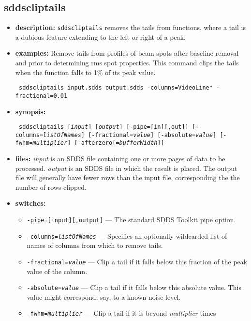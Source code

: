\newpage
\subsection{sddscliptails}
\label{sddscliptails}

\begin{itemize}
\item {\bf description:}
\verb|sddscliptails| removes the tails from functions, where a tail is a dubious feature
extending to the left or right of a peak.
\item {\bf examples:}
Remove tails from profiles of beam spots after baseline removal and prior to determining
rms spot properties.  This command clips the tails when the function falls to 1\% of
its peak value.
\begin{flushleft}{\tt
sddscliptails input.sdds output.sdds -columns=VideoLine* -fractional=0.01
}\end{flushleft}
\item {\bf synopsis:} 
\begin{flushleft}{\tt
sddscliptails [{\em input}] [{\em output}] [-pipe=[in][,out]]
[-columns={\em listOfNames}] [-fractional={\em value}] [-absolute={\em value}] [-fwhm={\em multiplier}]
[-afterzero[={\em bufferWidth}]]
}\end{flushleft}
\item {\bf files:}
{\em input} is an SDDS file containing one or more pages of data to be processed.
{\em output} is an SDDS file in which the result is placed.  The output file will
generally have fewer rows than the input file, corresponding the the number of
rows clipped.
\item {\bf switches:}
    \begin{itemize}
    \item {\tt -pipe=[input][,output]} --- The standard SDDS Toolkit pipe option.
    \item {\tt -columns={\em listOfNames}} --- Specifies an optionally-wildcarded list
        of names of columns from which to remove tails.
    \item {\tt -fractional={\em value}} --- Clip a tail if it falls below this fraction of the peak
        value of the column.
    \item {\tt -absolute={\em value}} --- Clip a tail if it falls below this absolute value.  This
        value might correspond, say, to a known noise level.
    \item {\tt -fwhm={\em multiplier}} --- Clip a tail if it is beyond {\em multiplier} times

\end{itemize}
\end{itemize}
